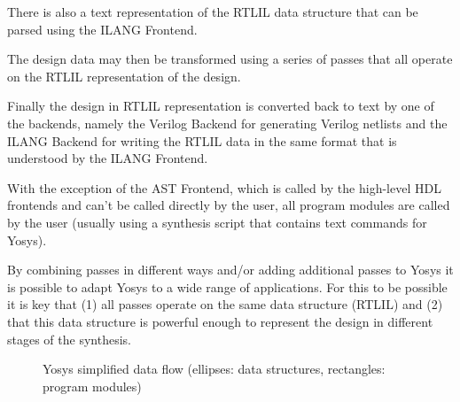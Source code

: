 There is also a text representation of the RTLIL data structure that can be
parsed using the ILANG Frontend.

The design data may then be transformed using a series of passes that all
operate on the RTLIL representation of the design.

Finally the design in RTLIL representation is converted back to text by one
of the backends, namely the Verilog Backend for generating Verilog netlists
and the ILANG Backend for writing the RTLIL data in the same format that is
understood by the ILANG Frontend.

With the exception of the AST Frontend, which is called by the high-level HDL
frontends and can't be called directly by the user, all program modules are
called by the user (usually using a synthesis script that contains text
commands for Yosys).

By combining passes in different ways and/or adding additional passes to Yosys
it is possible to adapt Yosys to a wide range of applications. For this to be
possible it is key that (1) all passes operate on the same data structure
(RTLIL) and (2) that this data structure is powerful enough to represent the design
in different stages of the synthesis.

\begin{figure}[t]
	\hfil
	\caption{Yosys simplified data flow (ellipses: data structures, rectangles: program modules)}
	\label{fig:Overview_flow}
\end{figure}

